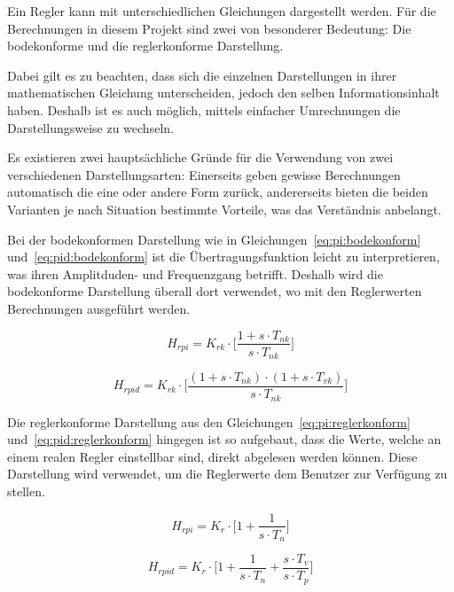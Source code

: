 Ein Regler  kann mit unterschiedlichen Gleichungen  dargestellt werden.  F\"ur
die Berechnungen  in diesem  Projekt sind  zwei von  besonderer Bedeutung: Die
bodekonforme und die reglerkonforme Darstellung.

Dabei gilt  es zu  beachten, dass  sich die  einzelnen Darstellungen  in ihrer
mathematischen Gleichung  unterscheiden, jedoch den  selben Informationsinhalt
haben. Deshalb   ist  es   auch  m\"oglich,  mittels  einfacher   Umrechnungen
die  Darstellungsweise   zu  wechseln.

Es  existieren  zwei  haupts\"achliche   Gr\"unde  f\"ur  die  Verwendung  von
zwei  verschiedenen Darstellungsarten: Einerseits  geben gewisse  Berechnungen
automatisch  die  eine oder  andere  Form  zur\"uck, andererseits  bieten  die
beiden Varianten je  nach Situation bestimmte Vorteile,  was das Verst\"andnis
anbelangt.

Bei der  bodekonformen Darstellung wie  in Gleichungen~\ref{eq:pi:bodekonform}
und~\ref{eq:pid:bodekonform}   ist   die  \"Ubertragungsfunktion   leicht   zu
interpretieren,  was ihren  Amplitduden- und  Frequenzgang betrifft.   Deshalb
wird  die  bodekonforme  Darstellung  \"uberall dort  verwendet,  wo  mit  den
Reglerwerten Berechnungen ausgef\"uhrt werden.

\begin{equation} \label{eq:pi:bodekonform}
    H_{rpi} = K_{rk} \cdot \biggl[ \frac{1 + s \cdot T_{nk}}{s \cdot T_{nk}} \biggr]
\end{equation}

\begin{equation} \label{eq:pid:bodekonform}
    H_{rpid} = K_{rk} \cdot \biggl[ \frac{(1 + s \cdot T_{nk}) \cdot (1 + s \cdot T_{vk}) }{ s \cdot T_{nk} } \biggr]
\end{equation}


Die reglerkonforme  Darstellung aus  den Gleichungen~\ref{eq:pi:reglerkonform}
und~\ref{eq:pid:reglerkonform}  hingegen ist  so  aufgebaut,  dass die  Werte,
welche  an  einem realen  Regler  einstellbar  sind, direkt  abgelesen  werden
k\"onnen. Diese Darstellung  wird verwendet,  um die Reglerwerte  dem Benutzer
zur Verf\"ugung zu stellen.

\begin{equation} \label{eq:pi:reglerkonform}
    H_{rpi} = K_{r} \cdot \biggl[ 1 + \frac{1}{s \cdot T_{n}} \biggr]
\end{equation}

\begin{equation} \label{eq:pid:reglerkonform}
    H_{rpid} = K_{r} \cdot \biggl[ 1 + \frac{1}{s \cdot T_n} + \frac{s \cdot T_v}{s \cdot T_p} \biggr]
\end{equation}

